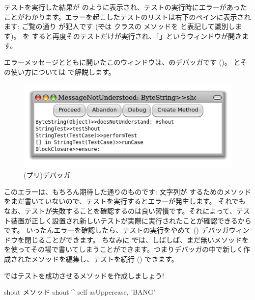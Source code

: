 \documentclass[a4paper,10pt,twoside]{book}
\begin{document}
テストを実行した結果が  のように表示され、テストの実行時にエラーがあったことがわかります。エラーを起こしたテストのリストは右下のペインに表示されます; ご覧の通り  が犯人です
(\st では  クラスの  メソッドを  と表記して識別します)。
 を \click すると再度そのテストだけが実行され、「」というウィンドウが開きます。

エラーメッセージとともに開いたこのウィンドウは、\st のデバッガです ()。
とその使い方については  で解説します。

\begin{figure}[hbt]
\centerline {\includegraphics[width=\textwidth]{Predebugger}}
\caption{(プリ)デバッガ}
\end{figure}

このエラーは、もちろん期待した通りのものです: 文字列が  するためのメソッドをまだ書いていないので、テストを実行するとエラーが発生します。
それでもなお、テストが失敗することを確認するのは良い習慣です。それによって、テスト装置が正しく設置され新しいテストが実際に実行されたことが確認できるからです。
いったんエラーを確認したら、テストの実行をやめて () デバッガウィンドウを閉じることができます。
ちなみに \st では、しばしば、まだ無いメソッドを  を使ってその場で書いてしまうことができます。つまりデバッガの中で新しく作成されたメソッドを編集し、テストを続行 () できます。

ではテストを成功させるメソッドを作成しましょう!

\begin{method}[shout]{shout メソッド}
shout
	^ self asUppercase, 'BANG'
\end{method}
\end{document}
